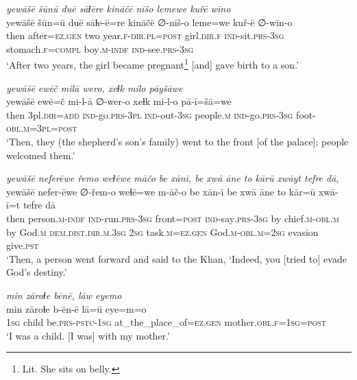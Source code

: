 \ea \label{KŠ.92}
\textit{yewāšē šūnū duē sāɫēre kināčē nīšo lemewe kuřē wīno} \\ 
\gll yewāšē šūn=ū duē sāɫe-ē=re kināčē ∅-nīš-o leme=we kuř-ē ∅-wīn-o \\ 
 then after\textsc{\textsc{=ez.gen}} two year\textsc{.f}\textsc{-dir}\textsc{.pl}\textsc{=\textsc{post}} girl\textsc{.dir}\textsc{.f} \textsc{ind-}sit\textsc{.prs}\textsc{-3sg} stomach\textsc{.f}\textsc{=compl} boy\textsc{.m}\textsc{-indf} \textsc{ind-}see\textsc{.prs}\textsc{-3sg} \\ 
\glt `After two years, the girl became pregnant\footnote{Lit. She sits on belly.} [and] gave birth to a son.'
\z 
 
\ea \label{KŠ.94}
\textit{yewāšē ewēč milā wero, xeɫk milo pāyšāwe} \\ 
\gll yewāšē ewē=č mi-l-ā ∅-wer-o xeɫk mi-l-o pā-ī=šā=we \\ 
 then 3pl\textsc{.dir}\textsc{=add} \textsc{ind-}go\textsc{.prs}\textsc{-3pl} \textsc{ind-}out\textsc{-3sg} people\textsc{.m} \textsc{ind-}go\textsc{.prs}\textsc{-3sg} foot\textsc{-obl}\textsc{.m}\textsc{=3pl}\textsc{=\textsc{post}} \\ 
\glt `Then, they (the shepherd’s son’s family) went to the front [of the palace]; people welcomed them.'
\z 
 
\ea \label{KŠ.97}
\textit{yewāšē neferēwe řemo weɫēwe māčo be xānī, be xwā āne to kārū xwāyt tefre dā,} \\ 
\gll yewāšē nefer-ēwe ∅-řem-o weɫē=we m-āč-o be xān-ī be xwā āne to kār=ū xwā-ī=t tefre dā \\ 
 then person\textsc{.m}\textsc{-indf} \textsc{ind-}run\textsc{.prs}\textsc{-3sg} front\textsc{=\textsc{post}} \textsc{ind-}say\textsc{.prs}\textsc{-3sg} by chief\textsc{.m}\textsc{-obl}\textsc{.m} by God\textsc{.m} \textsc{dem.dist}\textsc{.dir}\textsc{.m}\textsc{.3sg} \textsc{2sg} task\textsc{.m}\textsc{\textsc{=ez.gen}} God\textsc{.m}\textsc{-obl}\textsc{.m}\textsc{=\textsc{2sg}} evasion give\textsc{.pst} \\ 
\glt `Then, a person went forward and said to the Khan, ‘Indeed, you [tried to] evade God’s destiny.'
\z 
 
\ea \label{ŽH.1}
\textit{min zāroɫe bēnē, lāw eyemo} \\ 
\gll min zāroɫe b-ēn-ē lā=ū eye=m=o \\ 
 \textsc{1sg} child be\textsc{.prs}\textsc{-pstc}\textsc{-1sg} at\_the\_place\_of\textsc{=ez}\textsc{.gen} mother\textsc{.obl}\textsc{\textsc{.f}}\textsc{=1sg}\textsc{=\textsc{post}} \\ 
\glt `I was a child. [I was] with my mother.'
\z 
 
